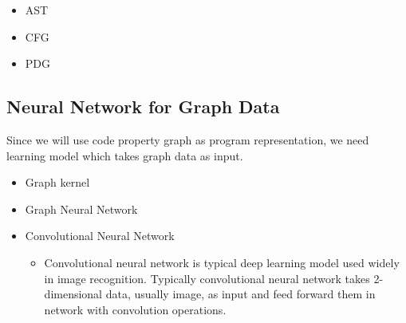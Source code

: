 \begin{itemize}
\item
AST
\item
CFG
\item
PDG
\end{itemize}

\subsection{Neural Network for Graph Data}

Since we will use code property graph as program representation, we need learning model which takes graph data as input.

\begin{itemize}
\item
Graph kernel

\item
Graph Neural Network

\item
Convolutional Neural Network

\begin{itemize}

\item
Convolutional neural network is typical deep learning model used widely in image recognition. Typically convolutional neural network takes 2-dimensional data, usually image, as input and feed forward them in network with convolution operations.
\end{itemize}

\end{itemize}